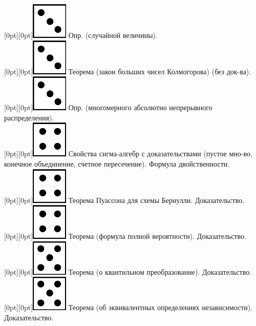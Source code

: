 \documentclass[10pt]{article}
\begin{document}
\raisebox{-1pt}[0pt][0pt]{\includegraphics[width=0.02\linewidth]{3.png}} Опр. (случайной величины). \\ 

\raisebox{-1pt}[0pt][0pt]{\includegraphics[width=0.02\linewidth]{3.png}} Теорема (закон больших чисел Колмогорова) (без док-ва). \\

\raisebox{-1pt}[0pt][0pt]{\includegraphics[width=0.02\linewidth]{3.png}} Опр. (многомерного абсолютно непрерывного распределения). \\

\raisebox{-1pt}[0pt][0pt]{\includegraphics[width=0.02\linewidth]{4.png}} Свойства сигма-алгебр с доказательствами (пустое мно-во, конечное объединение, счетное пересечение). Формула двойственности. \\

\raisebox{-1pt}[0pt][0pt]{\includegraphics[width=0.02\linewidth]{4.png}} Теорема Пуассона для схемы Бернулли. Доказательство. \\

\raisebox{-1pt}[0pt][0pt]{\includegraphics[width=0.02\linewidth]{4.png}} Теорема (формула полной вероятности). Доказательство. \\

\raisebox{-1pt}[0pt][0pt]{\includegraphics[width=0.02\linewidth]{5.png}}  Теорема (о квантильном преобразование). Доказательство. \\

\raisebox{-1pt}[0pt][0pt]{\includegraphics[width=0.02\linewidth]{5.png}} Теорема (об эквивалентных определениях независимости). Доказательство. \\
\end{document}
